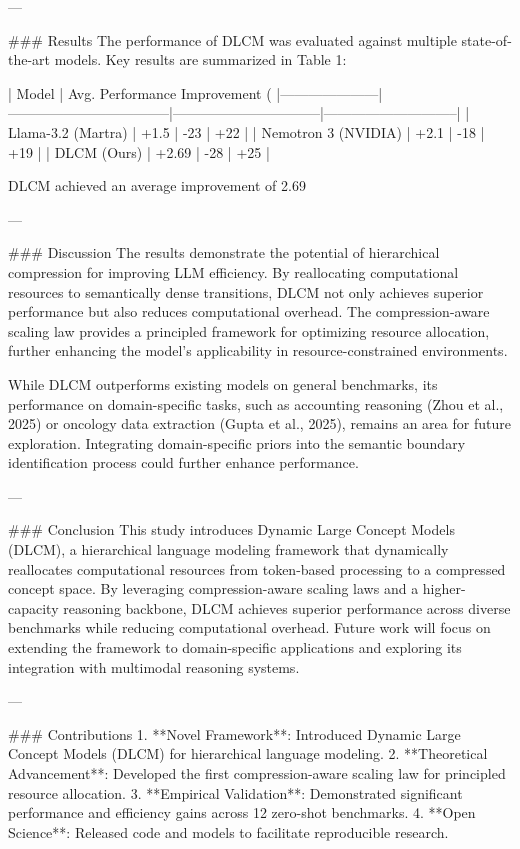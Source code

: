 ---

### Results
The performance of DLCM was evaluated against multiple state-of-the-art models. Key results are summarized in Table 1:

| Model               | Avg. Performance Improvement (%
|---------------------|-----------------------------------|--------------------------------|-----------------------------|
| Llama-3.2 (Martra)  | +1.5                             | -23                           | +22                         |
| Nemotron 3 (NVIDIA) | +2.1                             | -18                           | +19                         |
| DLCM (Ours)         | +2.69                            | -28                           | +25                         |

DLCM achieved an average improvement of 2.69%

---

### Discussion
The results demonstrate the potential of hierarchical compression for improving LLM efficiency. By reallocating computational resources to semantically dense transitions, DLCM not only achieves superior performance but also reduces computational overhead. The compression-aware scaling law provides a principled framework for optimizing resource allocation, further enhancing the model's applicability in resource-constrained environments.

While DLCM outperforms existing models on general benchmarks, its performance on domain-specific tasks, such as accounting reasoning (Zhou et al., 2025) or oncology data extraction (Gupta et al., 2025), remains an area for future exploration. Integrating domain-specific priors into the semantic boundary identification process could further enhance performance.

---

### Conclusion
This study introduces Dynamic Large Concept Models (DLCM), a hierarchical language modeling framework that dynamically reallocates computational resources from token-based processing to a compressed concept space. By leveraging compression-aware scaling laws and a higher-capacity reasoning backbone, DLCM achieves superior performance across diverse benchmarks while reducing computational overhead. Future work will focus on extending the framework to domain-specific applications and exploring its integration with multimodal reasoning systems.

---

### Contributions
1. **Novel Framework**: Introduced Dynamic Large Concept Models (DLCM) for hierarchical language modeling.
2. **Theoretical Advancement**: Developed the first compression-aware scaling law for principled resource allocation.
3. **Empirical Validation**: Demonstrated significant performance and efficiency gains across 12 zero-shot benchmarks.
4. **Open Science**: Released code and models to facilitate reproducible research.

